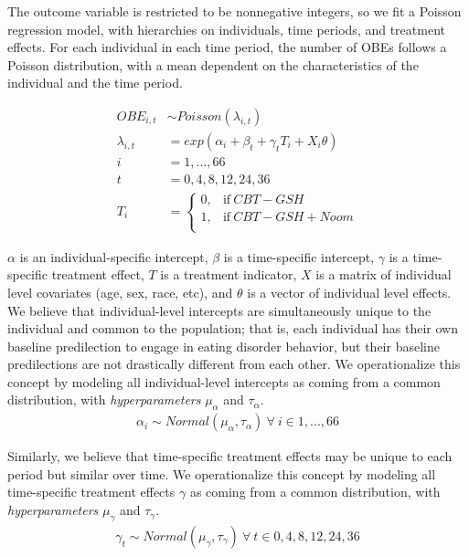 \documentclass[12pt, oneside]{article}
\begin{document}
The outcome variable is restricted to be nonnegative integers, so we fit a Poisson regression model, with hierarchies on individuals, time periods, and treatment effects.  For each individual in each time period, the number of OBEs follows a Poisson distribution, with a mean dependent on the characteristics of the individual and the time period.  

\begin{align}
OBE_{i,t} &\sim Poisson(\lambda_{i,t}) \\
\lambda_{i,t} &= exp(\alpha_i + \beta_t + \gamma_tT_i + X_i\theta) \\
i &= 1, ..., 66 \\
t &= 0, 4, 8, 12, 24, 36 \\
T_i &=
    \begin{cases}
      0, & \text{if}\ CBT-GSH \\
      1, & \text{if}\ CBT-GSH + Noom \\
    \end{cases}
\end{align}

$\alpha$ is an individual-specific intercept, $\beta$ is a time-specific intercept, $\gamma$ is a time-specific treatment effect, $T$ is a treatment indicator, $X$ is a matrix of individual level covariates (age, sex, race, etc), and $\theta$ is a vector of individual level effects.
\\

We believe that individual-level intercepts are simultaneously unique to the individual and common to the population; that is, each individual has their own baseline predilection to engage in eating disorder behavior, but their baseline predilections are not drastically different from each other.  We operationalize this concept by modeling all individual-level intercepts as coming from a common distribution, with \emph{hyperparameters} $\mu_{\alpha}$ and $\tau_{\alpha}$.
\begin{align}
\alpha_i \sim Normal(\mu_{\alpha}, \tau_{\alpha}) \ \forall \ i \in 1,...,66
\end{align} 

Similarly, we believe that time-specific treatment effects may be unique to each period but similar over time. We operationalize this concept by modeling all time-specific treatment effects $\gamma$ as coming from a common distribution, with \emph{hyperparameters} $\mu_{\gamma}$ and $\tau_{\gamma}$.
\begin{align}
\gamma_t \sim Normal(\mu_{\gamma}, \tau_{\gamma}) \ \forall \ t \in 0, 4, 8, 12, 24, 36
\end{align} 
\end{document}

